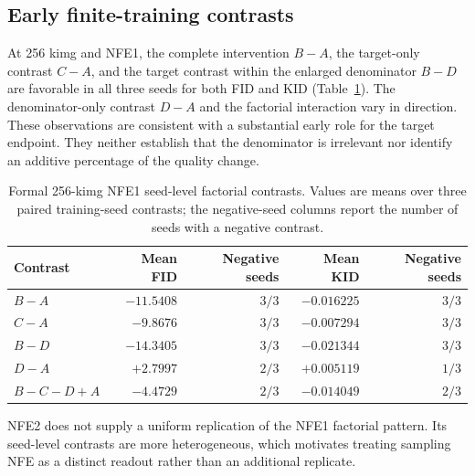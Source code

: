 \documentclass{article}
\newif\ifshowcomments
\newcommand{\empnote}[1]{%
  \ifshowcomments{\color{empiricalgreen}\textbf{[EMPIRICAL CHECK: #1]}}\fi}
\newcommand{\claimnote}[1]{%
  \ifshowcomments{\color{claimpurple}\textbf{[CLAIM CEILING: #1]}}\fi}
\begin{document}
\empnote{Methods owner: add the final architecture, batch size, optimizer
hyperparameters, EMA, data preprocessing, and hardware table from the frozen
run manifests. Do not infer missing values from memory.}

\subsection{Early finite-training contrasts}

At 256 kimg and NFE1, the complete intervention $B-A$, the target-only
contrast $C-A$, and the target contrast within the enlarged denominator
$B-D$ are favorable in all three seeds for both FID and KID
(Table~\ref{tab:factorial-256}). The denominator-only contrast $D-A$ and the
factorial interaction vary in direction. These observations are consistent
with a substantial early role for the target endpoint. They neither establish
that the denominator is irrelevant nor identify an additive percentage of the
quality change.

\begin{table}[t]
  \caption{Formal 256-kimg NFE1 seed-level factorial contrasts. Values are
  means over three paired training-seed contrasts; the negative-seed columns
  report the number of seeds with a negative contrast.}
  \label{tab:factorial-256}
  \centering
  \small
  \begin{tabular}{lrrrr}
    \toprule
    Contrast & Mean FID & Negative seeds & Mean KID & Negative seeds \\
    \midrule
    $B-A$ & $-11.5408$ & $3/3$ & $-0.016225$ & $3/3$ \\
    $C-A$ & $ -9.8676$ & $3/3$ & $-0.007294$ & $3/3$ \\
    $B-D$ & $-14.3405$ & $3/3$ & $-0.021344$ & $3/3$ \\
    $D-A$ & $ +2.7997$ & $2/3$ & $+0.005119$ & $1/3$ \\
    $B-C-D+A$ & $-4.4729$ & $2/3$ & $-0.014049$ & $2/3$ \\
    \bottomrule
  \end{tabular}
\end{table}

NFE2 does not supply a uniform replication of the NFE1 factorial pattern.
Its seed-level contrasts are more heterogeneous, which motivates treating
sampling NFE as a distinct readout rather than an additional replicate.

\claimnote{Describe the target result as directionally consistent at this
endpoint. Do not write \emph{target geometry explains X percent},
\emph{denominator does not matter}, or
\emph{the factorial endpoint validates the algebra}.}
\end{document}
